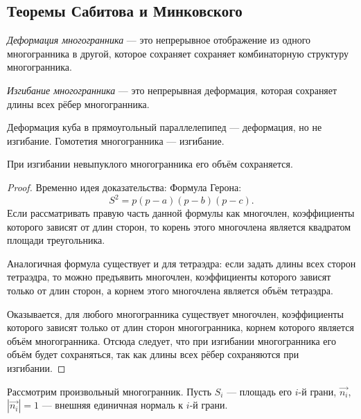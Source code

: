 \subsection{Теоремы Сабитова и Минковского}
\begin{definition}
    \textit{Деформация многогранника} — это непрерывное отображение из одного многогранника в другой, которое сохраняет сохраняет комбинаторную структуру многогранника.
\end{definition} 
\begin{definition}
    \textit{Изгибание многогранника} — это непрерывная деформация, которая сохраняет длины всех рёбер многогранника.
\end{definition} 
\begin{example}
    Деформация куба в прямоугольный параллелепипед — деформация, но не изгибание. Гомотетия многогранника — изгибание.
\end{example}
\begin{theorem}[Сабитов]
    При изгибании невыпуклого многогранника его объём сохраняется.
\end{theorem}
\begin{proof}
    Временно идея доказательства: Формула Герона:
    \[S^2 = p(p - a)(p - b)(p - c).\]
    Если рассматривать правую часть данной формулы как многочлен, коэффициенты которого зависят от длин сторон, то корень этого многочлена является квадратом площади треугольника.

    Аналогичная формула существует и для тетраэдра: если задать длины всех сторон тетраэдра, то можно предъявить многочлен, коэффициенты которого зависят только от длин сторон, а корнем этого многочлена является объём тетраэдра.

    Оказывается, для любого многогранника существует многочлен, коэффициенты которого зависят только от длин сторон многогранника, корнем которого является объём многогранника. Отсюда следует, что при изгибании многогранника его объём будет сохраняться, так как длины всех рёбер сохраняются при изгибании.
\end{proof}

Рассмотрим произвольный многогранник. Пусть $S_i$ — площадь его $i$-й грани, $\overrightarrow{n_i}$, $|\overrightarrow{n_i}| = 1$ — внешняя единичная нормаль к $i$-й грани.

